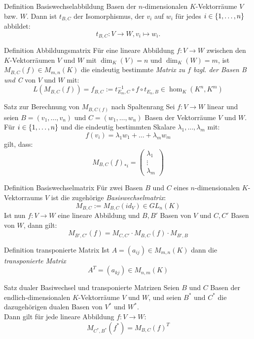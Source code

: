 \documentclass[main.tex]{subfiles}
\begin{document}
\begin{karte}{Definition Basiswechselabbildung}
    Basen der \(n\)-dimensionalen \(K\)-Vektorräume \(V\) bzw. \(W\).
    Dann ist \(t_{B,C}\) der Isomorphismus, der \(v_i\) auf \(w_i\) für 
    jedes \(i \in \{1, \ldots ,n\}\) abbildet: 
    \[ t_{B,C}: V \rightarrow W, v_i \mapsto w_i. \]
\end{karte}
\begin{karte}{Definition Abbildungsmatrix}
    Für eine lineare Abbildung \(f:V \rightarrow W\) zwischen den
    \(K\)-Vektorräumen \(V\) und \(W\) mit \(\dim_K(V) = n\) und 
    \(\dim_K(W) = m\), ist \(M_{B,C}(f) \in M_{m,n}(K)\) die 
    eindeutig bestimmte \textit{Matrix zu \(f\) bzgl. der Basen 
    B und C} von \(V\) und \(W\) mit: 
    \[ L(M_{B,C}(f)) = f_{B,C} := t_{E_m,C}^{-1} \circ f \circ t_{E_n,B} 
    \in \hom_K(K^n,K^m)\] 
\end{karte}
\begin{karte}{Satz zur Berechnung von \(M_{B,C(f)}\) nach Spaltenrang}
    Sei \(f: V \rightarrow W\) linear und seien \(B = (v_1, \ldots ,v_n)\)
    und \(C = (w_1, \ldots , w_n)\) Basen der Vektorräume \(V\) und \(W\).
    Für \(i \in \{1,\ldots,n\}\) und die eindeutig bestimmten Skalare
    \(\lambda_1,\ldots,\lambda_m\) mit:
    \[f(v_i) = \lambda_1w_1 + \ldots + \lambda_mw_m\]
    gilt, dass: 
    \[M_{B,C}(f)_{*i} = 
    \begin{pmatrix}
        \lambda_1 \\
        \vdots\\
        \lambda_m
    \end{pmatrix}\]
\end{karte}
\begin{karte}{Definition Basiswechselmatrix}
    Für zwei Basen \(B\) und \(C\) eines \(n\)-dimensionalen 
    \(K\)-Vektorraums \(V\) ist die zugehörige 
    \textit{Basiswechselmatrix}:
    \[M_{B,C} := M_{B,C}(id_V) \in GL_n(K) \]
    Ist nun \(f: V \rightarrow W\) eine lineare Abbildung und 
    \(B,B'\) Basen von \(V\) und \(C,C'\) Basen von \(W\), dann gilt:
    \[ M_{B',C'}(f) = M_{C,C'} \cdot M_{B,C}(f) \cdot M_{B',B} \]
\end{karte}
\begin{karte}{Definition transponierte Matrix}
    Ist \(A = (a_{ij}) \in M_{m,n}(K)\) dann die \textit{transponierte Matrix}
    \[ A^T  = (a_{kj}) \in M_{n,m}(K) \]
\end{karte}
\begin{karte}{Satz dualer Basiwechsel und transponierte Matrizen}
    Seien \(B\) und \(C\) Basen der endlich-dimensionalen 
    \(K\)-Vektorräume \(V\) und \(W\), und seien \(B^*\) und \(C^*\)
    die dazugehörigen dualen Basen von \(V^*\) und \(W^*\).\\
    Dann gilt für jede lineare Abbildung \(f: V \rightarrow W\):
    \[M_{C^*,B^*}(f^*) = M_{B,C}(f)^T\]   

\end{karte}
\end{document}
